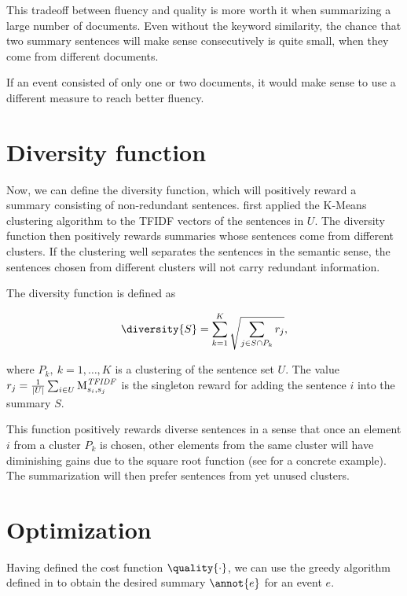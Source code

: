 This tradeoff between fluency and quality is more worth it when summarizing a large number of documents. Even without the keyword similarity, the chance that two summary sentences will make sense consecutively is quite small, when they come from different documents.

If an event consisted of only one or two documents, it would make sense to use a different measure to reach better fluency.

\section{Diversity function}
Now, we can define the diversity function, which will positively reward a summary consisting of non-redundant sentences. \cite{multi-summarization-2} first applied the K-Means clustering algorithm to the TFIDF vectors of the sentences in $U$. The diversity function then positively rewards summaries whose sentences come from different clusters. If the clustering well separates the sentences in the semantic sense, the sentences chosen from different clusters will not carry redundant information.

The diversity function is defined as

\begin{equation} \label{eq:diversity}
	\diversity{S} = \sum_{k = 1}^{K} \sqrt{\sum_{j \in S \cap P_{k}} r_{j}},
\end{equation}

where $P_{k},\ k = 1, \dots, K$ is a clustering of the sentence set $U$. The value $r_{j} = \frac{1}{\left| U \right|} \sum_{i \in U} \text{M}_{s_{i}, s_{j}}^{\mathit{TFIDF}}$ is the singleton reward for adding the sentence $i$ into the summary $S$.

This function positively rewards diverse sentences in a sense that once an element $i$ from a cluster $P_{k}$ is chosen, other elements from the same cluster will have diminishing gains due to the square root function (see \cite{multi-summarization-2} for a concrete example). The summarization will then prefer sentences from yet unused clusters.


\section{Optimization}
Having defined the cost function $\quality{\cdot}$, we can use the greedy algorithm defined in \cite{multi-summarization-1} to obtain the desired summary $\annot{e}$ for an event $e$.

